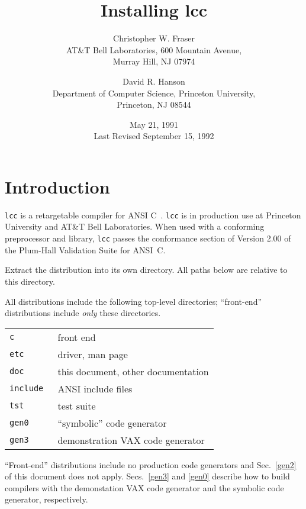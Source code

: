 
\title{Installing lcc}

\author{Christopher W. Fraser\\
AT\&T Bell Laboratories, 600 Mountain Avenue,\\
Murray Hill, NJ 07974
\and
David R. Hanson\\
Department of Computer Science, Princeton University,\\
Princeton, NJ 08544}

\date{May 21, 1991\\ Last Revised September 15, 1992}


%

\maketitle

\section{Introduction}

\verb|lcc| is a retargetable compiler for ANSI C~\cite{ansi:Cstandard}.
\verb|lcc| is in production use
at Princeton University and AT\&T Bell Laboratories.
When used with a conforming preprocessor and library,
\verb|lcc| passes the conformance section of Version 2.00 of the Plum-Hall
Validation Suite for ANSI~C.

Extract the distribution into its own directory.
All paths below are relative to this directory.

All distributions include the following top-level directories;
``front-end'' distributions include {\em only\/} these directories.

\begin{center}
\begin{tabular}{ll}
\tt c		& front end \\
\tt etc		& driver, man page \\
\tt doc		& this document, other documentation \\
\tt include	& ANSI include files \\
\tt tst		& test suite \\
\tt gen0	& ``symbolic'' code generator \\
\tt gen3	& demonstration VAX code generator \\
\end{tabular}
\end{center}
``Front-end'' distributions include no production code generators
and Sec.~\ref{gen2} of this document does not apply.
Secs.~\ref{gen3} and \ref{gen0} describe how to build compilers
with the demonstation VAX code generator and
the symbolic code generator, respectively.

